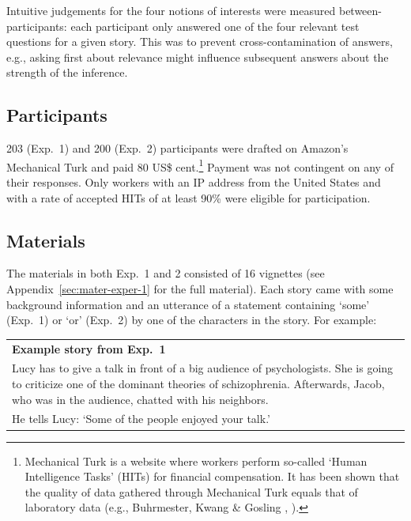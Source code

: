 \documentclass[12pt]{article}
\begin{document}
Intuitive judgements for the four notions of interests were measured between-participants: each participant only answered one of the four relevant test questions for a given story. This was to prevent cross-contamination of answers, e.g., asking first about relevance might influence subsequent answers about the strength of the inference.

\subsection*{Participants}

203 (Exp.\ 1) and 200 (Exp.\ 2) participants were drafted on Amazon's Mechanical Turk and paid 80 US\$ cent.\footnote{Mechanical Turk is a website where workers perform so-called `Human Intelligence Tasks' (HITs) for financial compensation. It has been shown that the quality of data gathered through Mechanical Turk equals that of laboratory data (e.g., Buhrmester, Kwang \& Gosling \citeyear{buhrmester2011}, \citealt{schnoebelen2010, sprouse2011}).} Payment was not contingent on any of their responses. Only workers with an IP address from the United States and with a rate of accepted HITs of at least 90\% were eligible for participation.

\subsection*{Materials}

The materials in both Exp.\ 1 and 2 consisted of 16 vignettes (see
Appendix~\ref{sec:mater-exper-1} for the full material). Each story came with some background information and an utterance of a statement containing `some' (Exp.\ 1) or `or' (Exp.\ 2) by one of the characters in the story. For example:

\begin{center}
\begin{tabular}{p{10cm}}
\textbf{Example story from Exp.\ 1} \\
  Lucy has to give a talk in front of a big audience of psychologists. She is going to criticize one of the dominant theories of schizophrenia. Afterwards, Jacob, who was in the audience, chatted with his neighbors.\\[.2cm]
  He tells Lucy: `Some of the people enjoyed your talk.'
\end{tabular}
\end{center}
\end{document}
